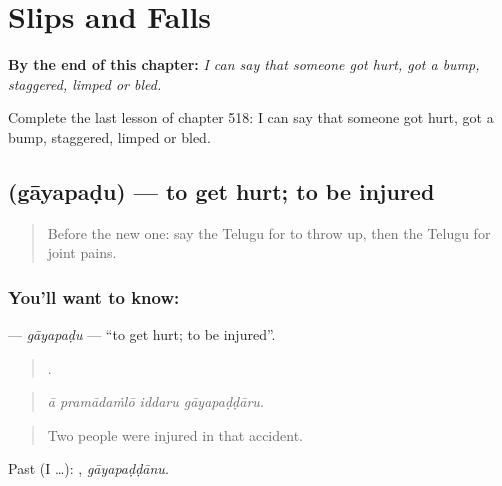 
\chapter{Slips and Falls}
\label{ch:te-slips-and-falls}

\begin{chapteropening}
\textbf{By the end of this chapter:} \emph{I can say that someone got hurt, got a bump, staggered, limped or bled.}

Complete the last lesson of chapter 518: I can say that someone got hurt, got a bump, staggered, limped or bled.
\end{chapteropening}

\section[\texorpdfstring{\te{గాయపడు} (gāyapaḍu)}{గాయపడు (gāyapaḍu)}]{ (gāyapaḍu) — to get hurt; to be injured}

\label{lesson:TE-C518-gayapadu}



\begin{quote}
Before the new one: say the Telugu for to throw up, then the Telugu for joint pains.
\end{quote}

\subsection*{You'll want to know: }
\textbf{} — \emph{gāyapaḍu} — \textquotedblleft{}to get hurt; to be injured\textquotedblright{}.

\begin{quote}
   .
\end{quote}

\begin{quote}
\emph{ā pramādaṁlō iddaru gāyapaḍḍāru.}
\end{quote}

\begin{quote}
Two people were injured in that accident.
\end{quote}

Past (I …): , \emph{gāyapaḍḍānu}.

